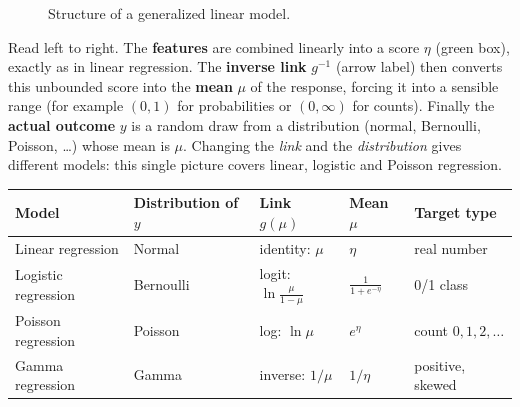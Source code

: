 \begin{figure}[!htbp]
\centering
{}
\caption{Structure of a generalized linear model.}\label{fig:glm}
\end{figure}

\begin{explain}
Read left to right. The \textbf{features} are combined linearly into a score $\eta$ (green box), exactly as in linear regression. The \textbf{inverse link} $g^{-1}$ (arrow label) then converts this unbounded score into the \textbf{mean} $\mu$ of the response, forcing it into a sensible range (for example $(0,1)$ for probabilities or $(0,\infty)$ for counts). Finally the \textbf{actual outcome} $y$ is a random draw from a distribution (normal, Bernoulli, Poisson, \dots) whose mean is $\mu$. Changing the \emph{link} and the \emph{distribution} gives different models: this single picture covers linear, logistic and Poisson regression.
\end{explain}

\begin{center}
\begin{tabular}{@{}p{3.1cm}p{2.7cm}p{2.7cm}p{2.5cm}p{2.6cm}@{}}
\toprule
\textbf{Model} & \textbf{Distribution of $y$} & \textbf{Link $g(\mu)$} & \textbf{Mean $\mu$} & \textbf{Target type}\\
\midrule
Linear regression & Normal & identity: $\mu$ & $\eta$ & real number\\
Logistic regression & Bernoulli & logit: $\ln\frac{\mu}{1-\mu}$ & $\frac1{1+e^{-\eta}}$ & 0/1 class\\
Poisson regression & Poisson & log: $\ln\mu$ & $e^{\eta}$ & count $0,1,2,\dots$\\
Gamma regression & Gamma & inverse: $1/\mu$ & $1/\eta$ & positive, skewed\\
\bottomrule
\end{tabular}
\end{center}

